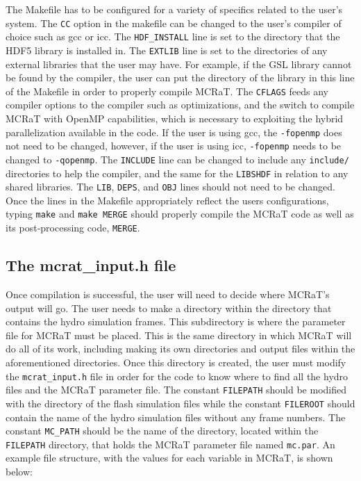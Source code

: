 \documentclass[12pt,a4paper]{article}
\begin{document}
The Makefile has to be configured for a variety of specifics related to the user's system. The \texttt{CC} option in the makefile can be changed to the user's compiler of choice such as gcc or icc. The \texttt{HDF\_INSTALL} line is set to the directory that the HDF5 library is installed in. The \texttt{EXTLIB} line is set to the directories of any external libraries that the user may have. For example, if the GSL library cannot be found by the compiler, the user can put the directory of the library in this line of the Makefile in order to properly compile MCRaT. The \texttt{CFLAGS} feeds any compiler options to the compiler such as optimizations, and the switch to compile MCRaT with OpenMP capabilities, which is necessary to exploiting the hybrid parallelization available in the code. If the user is using gcc, the \texttt{-fopenmp} does not need to be changed, however, if the user is using icc, \texttt{-fopenmp} needs to be changed to \texttt{-qopenmp}. The \texttt{INCLUDE} line can be changed to include any \texttt{include/} directories to help the compiler, and the same for the \texttt{LIBSHDF} in relation to any shared libraries. The \texttt{LIB}, \texttt{DEPS}, and \texttt{OBJ} lines should not need to be changed. Once the lines in the Makefile appropriately reflect the users configurations, typing \texttt{make} and \texttt{make MERGE} should properly compile the MCRaT code as well as its post-processing code, \texttt{MERGE}.

\subsection{The mcrat\_input.h file}
Once compilation is successful, the user will need to decide where MCRaT's output will go. The user needs to make a directory within the directory that contains the hydro simulation frames. This subdirectory is where the parameter file for MCRaT must be placed. This is the same directory in which MCRaT will do all of its work, including making its own directories and output files within the aforementioned directories. Once this directory is created, the user must modify the \texttt{mcrat\_input.h} file in order for the code to know where to find all the hydro files and the MCRaT parameter file. The constant \texttt{FILEPATH} should be modified with the directory of the flash simulation files while the constant \texttt{FILEROOT} should contain the name of the hydro simulation files without any frame numbers. The constant \texttt{MC\_PATH} should be the name of the directory, located within the \texttt{FILEPATH} directory, that holds the MCRaT parameter file named \texttt{mc.par}. An example file structure, with the values for each variable in MCRaT, is shown below: \\
\begin{figure}[h!]
\end{figure}
\end{document}
